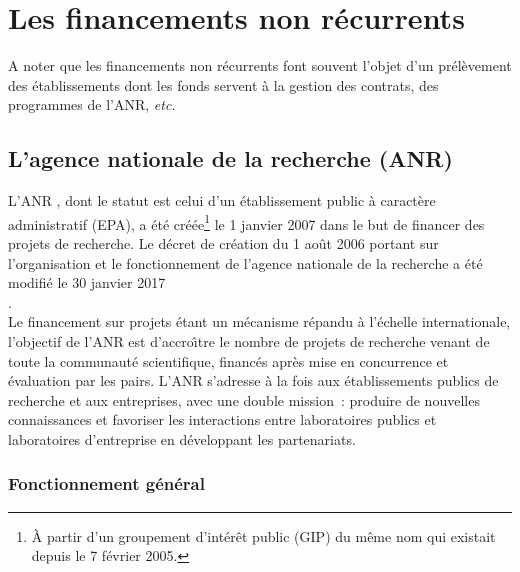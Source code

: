 
\chapter{Les financements non r\'ecurrents}
\label{financement-projets}



A noter que les financements non r\'ecurrents font souvent l'objet d'un
pr\'el\`evement des {\'e}tablissements dont les fonds servent \`a la gestion des contrats,
des programmes de l'ANR, {\em etc.}


\section{L'agence nationale de la recherche (ANR)}

L'ANR , dont le statut est celui
d'un \'etablissement public \`a caract\`ere administratif (EPA),
a \'et\'e cr\'e\'ee\footnote{\`A partir d'un groupement d'int\'er\^et public (GIP) du m\^eme nom
qui existait depuis le 7 f\'evrier 2005.} le 1\ier{} janvier 2007
dans le but de financer des projets de recherche. Le d\'ecret de cr\'eation du
1\ier{} ao\^ut 2006 portant sur l'organisation et le fonctionnement
de l'agence nationale de la recherche a \'et\'e modifi\'e le 30 janvier 2017 
\\.\\

Le financement sur projets \'etant un m\'ecanisme
r\'epandu \`a l'\'echelle internationale,
l'objectif de l'ANR est d'accro\^\i  tre le nombre de projets de
recherche venant de toute la communaut\'e scientifique, financ\'es
apr\`es mise en concurrence et \'evaluation par les pairs.
L'ANR s'adresse \`a la fois aux \'etablissements publics de recherche
et aux entreprises, avec une double mission~: produire de nouvelles
connaissances et favoriser les interactions entre laboratoires
publics et laboratoires d'entreprise en d\'eveloppant les
partenariats.


\subsection{Fonctionnement g\'en\'eral}

